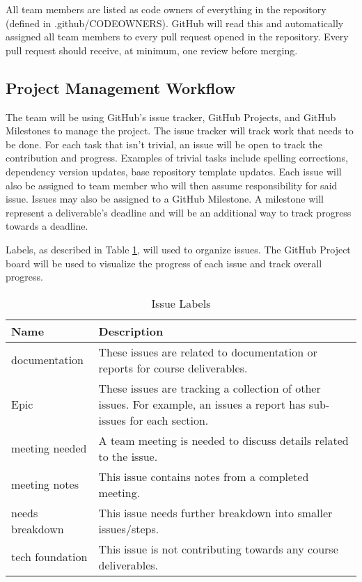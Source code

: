 \documentclass{article}
\begin{document}
All team members are listed as code owners of everything in the repository (defined in
.github/CODEOWNERS). GitHub will read this and automatically assigned all team members to every
pull request opened in the repository. Every pull request should receive, at minimum, one review
before merging.

\subsection{Project Management Workflow}

The team will be using GitHub's issue tracker, GitHub Projects, and GitHub Milestones to manage the
project. The issue tracker will track work that needs to be done. For each task that isn't trivial,
an issue will be open to track the contribution and progress. Examples of trivial tasks include
spelling corrections, dependency version updates, base repository template updates. Each issue will
also be assigned to team member who will then assume responsibility for said issue. Issues may also
be assigned to a GitHub Milestone. A milestone will represent a deliverable's deadline and will be
an additional way to track progress towards a deadline.

Labels, as described in Table \ref{issueLabels}, will used to organize issues. The GitHub Project
board will be used to visualize the progress of each issue and track overall progress.

\begin{table}[H]
	\centering
	\caption{Issue Labels}
	\vspace{5pt}
	\begin{tabular}{|p{}|p{}|}
		\hline
		\textbf{Name}   & \textbf{Description}                                                                    \\
		\hline
		documentation   & These issues are related to documentation or reports for course deliverables.           \\
		\hline
		Epic            & These issues are tracking a collection of other issues. For example, an issues a report
		has sub-issues for each section.                                                                          \\
		\hline
		meeting needed  & A team meeting is needed to discuss details related to the issue.                       \\
		\hline
		meeting notes   & This issue contains notes from a completed meeting.                                     \\
		\hline
		needs breakdown & This issue needs further breakdown into smaller issues/steps.                           \\
		\hline
		tech foundation & This issue is not contributing towards any course deliverables.                         \\
		\hline
	\end{tabular}

	\label{issueLabels}
\end{table}
\end{document}
